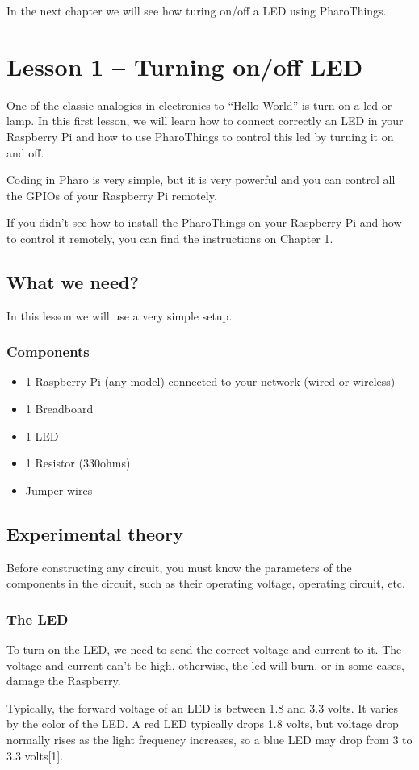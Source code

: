 \documentclass[10pt,twoside,english]{_support/latex/sbabook/sbabook}
\begin{document}
In the next chapter we will see how turing on/off a LED using PharoThings. 
\chapter{Lesson 1 – Turning on/off LED }
One of the classic analogies in electronics to “Hello World” is turn on a led or lamp. In this first lesson, we will learn how to connect correctly an LED in your Raspberry Pi and how to use PharoThings to control this led by turning it on and off.

Coding in Pharo is very simple, but it is very powerful and you can control all the GPIOs of your Raspberry Pi remotely.

If you didn’t see how to install the PharoThings on your Raspberry Pi and how to control it remotely, you can find the instructions on Chapter 1.
\section{What we need?}
In this lesson we will use a very simple setup.
\subsection{Components}
\begin{itemize}
\item 1 Raspberry Pi (any model) connected to your network (wired or wireless)
\item 1 Breadboard
\item 1 LED
\item 1 Resistor (330ohms)
\item Jumper wires
\end{itemize}
\section{Experimental theory}
Before constructing any circuit, you must know the parameters of the components in the circuit, such as their operating voltage, operating circuit, etc.
\subsection{The LED}
To turn on the LED, we need to send the correct voltage and current to it. The voltage and current can’t be high, otherwise, the led will burn, or in some cases, damage the Raspberry.

Typically, the forward voltage of an LED is between 1.8 and 3.3 volts. It varies by the color of the LED. A red LED typically drops 1.8 volts, but voltage drop normally rises as the light frequency increases, so a blue LED may drop from 3 to 3.3 volts{[}1{]}.
\end{document}
